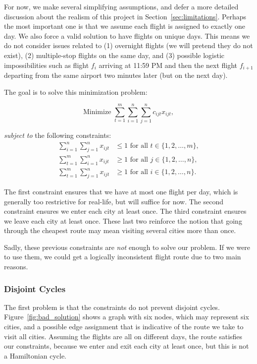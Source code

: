 \documentclass{article}
\begin{document}
For now, we make several simplifying assumptions, and defer a more detailed discussion about the realism of this project in
Section~\ref{sec:limitations}. Perhaps the most important one is that we assume each flight is assigned to exactly one day. We also force a valid
solution to have flights on unique days. This means we do not consider issues related to (1) overnight flights (we will pretend they do not exist),
(2) multiple-stop flights on the same day, and (3) possible logistic impossibilities such as flight $f_i$ arriving at 11:59 PM and then the next
flight $f_{i+1}$ departing from the same airport two minutes later (but on the next day).

The goal is to solve this minimization problem:

\begin{equation}
\mbox{Minimize } \sum_{t=1}^{m} \sum_{i=1}^{n} \sum_{j=1}^{n} c_{ijt}x_{ijt},
\end{equation}

\emph{subject to} the following constraints:
\begin{align}
\sum_{i=1}^{n} \sum_{j=1}^{n} x_{ijt} &\le 1 \mbox{ for all } t \in \{1, 2, \ldots, m\}, \\ 
\sum_{t=1}^{m} \sum_{i=1}^{n} x_{ijt} &\ge 1 \mbox{ for all } j \in \{1, 2, \ldots, n\}, \\
\sum_{t=1}^{m} \sum_{j=1}^{n} x_{ijt} &\ge 1 \mbox{ for all } i \in \{1, 2, \ldots, n\}.
\end{align}

The first constraint ensures that we have at most one flight per day, which is generally too restrictive for real-life, but will suffice for now. The
second constraint ensures we enter each city at least once. The third constraint ensures we leave each city at least once. These last two reinforce
the notion that going through the cheapest route may mean visiting several cities more than once.

Sadly, these previous constraints are \emph{not} enough to solve our problem. If we were to use them, we could get a logically inconsistent flight
route due to two main reasons.

\subsubsection{Disjoint Cycles}\label{sec:disjoint_cycles}

The first problem is that the constraints do not prevent disjoint cycles. Figure~\ref{fig:bad_solution} shows a graph with six nodes, which may
represent six cities, and a possible edge assignment that is indicative of the route we take to visit all cities. Assuming the flights are all on
different days, the route satisfies our constraints, because we enter and exit each city at least once, but this is not a Hamiltonian cycle.
\end{document}
